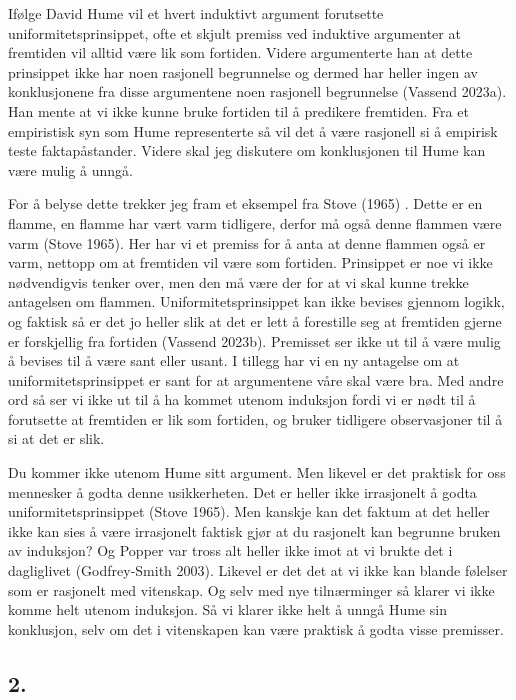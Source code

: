 \documentclass[
  letterpaper,
  DIV=11,
  numbers=noendperiod]{scrreprt}
\begin{document}
Ifølge David Hume vil et hvert induktivt argument forutsette
uniformitetsprinsippet, ofte et skjult premiss ved induktive argumenter
at fremtiden vil alltid være lik som fortiden. Videre argumenterte han
at dette prinsippet ikke har noen rasjonell begrunnelse og dermed har
heller ingen av konklusjonene fra disse argumentene noen rasjonell
begrunnelse (Vassend 2023a). Han mente at vi ikke kunne bruke fortiden
til å predikere fremtiden. Fra et empiristisk syn som Hume representerte
så vil det å være rasjonell si å empirisk teste faktapåstander. Videre
skal jeg diskutere om konklusjonen til Hume kan være mulig å unngå.

For å belyse dette trekker jeg fram et eksempel fra Stove (1965) . Dette
er en flamme, en flamme har vært varm tidligere, derfor må også denne
flammen være varm (Stove 1965). Her har vi et premiss for å anta at
denne flammen også er varm, nettopp om at fremtiden vil være som
fortiden. Prinsippet er noe vi ikke nødvendigvis tenker over, men den må
være der for at vi skal kunne trekke antagelsen om flammen.
Uniformitetsprinsippet kan ikke bevises gjennom logikk, og faktisk så er
det jo heller slik at det er lett å forestille seg at fremtiden gjerne
er forskjellig fra fortiden (Vassend 2023b). Premisset ser ikke ut til å
være mulig å bevises til å være sant eller usant. I tillegg har vi en ny
antagelse om at uniformitetsprinsippet er sant for at argumentene våre
skal være bra. Med andre ord så ser vi ikke ut til å ha kommet utenom
induksjon fordi vi er nødt til å forutsette at fremtiden er lik som
fortiden, og bruker tidligere observasjoner til å si at det er slik.

Du kommer ikke utenom Hume sitt argument. Men likevel er det praktisk
for oss mennesker å godta denne usikkerheten. Det er heller ikke
irrasjonelt å godta uniformitetsprinsippet (Stove 1965). Men kanskje kan
det faktum at det heller ikke kan sies å være irrasjonelt faktisk gjør
at du rasjonelt kan begrunne bruken av induksjon? Og Popper var tross
alt heller ikke imot at vi brukte det i dagliglivet (Godfrey-Smith
2003). Likevel er det det at vi ikke kan blande følelser som er
rasjonelt med vitenskap. Og selv med nye tilnærminger så klarer vi ikke
komme helt utenom induksjon. Så vi klarer ikke helt å unngå Hume sin
konklusjon, selv om det i vitenskapen kan være praktisk å godta visse
premisser.

\hypertarget{section-1}{%
\subsection{2.}\label{section-1}}
\end{document}
